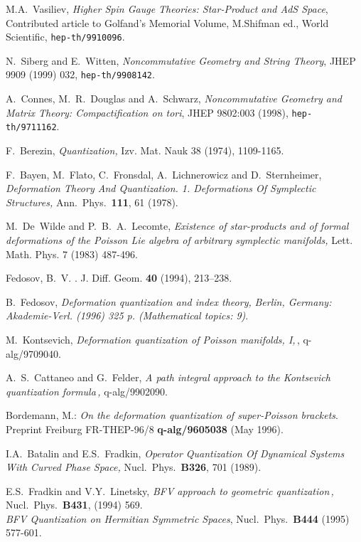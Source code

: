 \documentclass[a4paper,11pt,oneside]{amsart}
\theoremstyle{plain}
\numberwithin{equation}{section} %
\numberwithin{figure}{section} %
\begin{document}
\begin{thebibliography}{33}
\bibitem{[Vasiliev]} M.A.~Vasiliev, {\em Higher Spin Gauge Theories:
Star-Product and AdS Space}, Contributed article to Golfand's
Memorial Volume, M.Shifman ed., World Scientific, {\tt hep-th/9910096}.


\bibitem{[SW]} N.~Siberg and E.~Witten, {\em Noncommutative
Geometry and String Theory}, JHEP 9909 (1999) 032,
{\tt hep-th/9908142}.


\bibitem{[CDS]}  A.~Connes, M.~R.~Douglas and A.~Schwarz,
{\em Noncommutative Geometry and Matrix Theory: Compactification
on tori}, JHEP 9802:003 (1998), {\tt hep-th/9711162}.

\bibitem{[Berezin]} F.~Berezin, {\em Quantization,}
Izv. Mat. Nauk 38 (1974), 1109-1165.


\bibitem{[BFFLS]}
F.~Bayen, M.~Flato, C.~Fronsdal, A.~Lichnerowicz and D.~Sternheimer,
{\em Deformation Theory And Quantization. 1. Deformations Of Symplectic
Structures,}
Ann.\ Phys.\ {\bf 111}, 61 (1978).

\bibitem{[DWL]}
M.~De~Wilde and P.~B.~A.~Lecomte,
{\em Existence of star-products
and of formal deformations of the Poisson Lie algebra of arbitrary
symplectic manifolds,}
 Lett. Math. Phys. 7 (1983) 487-496.

Fedosov, B.~V. .
\newblock J. Diff. Geom.  {\bf 40} (1994), 213--238.

 B.~Fedosov,
{\em Deformation quantization and index theory,}
{\it  Berlin, Germany: Akademie-Verl. (1996) 325 p. (Mathematical
  topics: 9)}.

\bibitem{[Kontsevich]}
M.~Kontsevich,
{\em Deformation quantization of Poisson manifolds, I,}\,,
q-alg/9709040.

\bibitem{[Felder]} A.~S.~Cattaneo and G.~Felder,
{\em A path integral approach to the Kontsevich quantization
formula\,,} q-alg/9902090.

 { Bordemann, M.: }
\newblock
{\em On the deformation quantization of
  super-Poisson brackets}.
\newblock Preprint Freiburg FR-THEP-96/8  {\bf q-alg/9605038} (May
1996).


\bibitem{[BF89]} I.A.~Batalin and E.S.~Fradkin,
{\em Operator Quantization Of Dynamical Systems
With Curved Phase Space,} Nucl.\ Phys.\ {\bf B326},
701 (1989).



\bibitem{[FL]}
E.S.~Fradkin and V.Y.~Linetsky,
{\em BFV approach to geometric quantization\,,}
Nucl.\ Phys.\ {\bf B431}, (1994) 569.\\
{\em BFV Quantization on Hermitian Symmetric Spaces},
Nucl.\ Phys.\ {\bf B444} (1995) 577-601.


\end{thebibliography}
\end{document}
